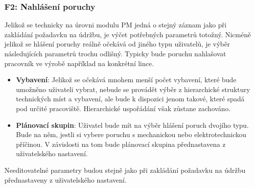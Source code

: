 \documentclass[thesis=M,czech]{FITthesis}[2012/06/26]
\begin{document}
\subsubsection{F2: Nahlášení poruchy}
Jelikož se technicky na úrovni modulu PM jedná o stejný záznam jako při zakládání požadavku na údržbu, je výčet potřebných parametrů totožný. Nicméně jelikož se hlášení poruchy reálně očekává od jiného typu uživatelů, je výběr následujících parametrů trochu odlišný. Typicky bude poruchu nahlašovat pracovník ve výrobě například na konkrétní lince. 
\begin{itemize}
	\item
	\textbf{Vybavení}: Jelikož se očekává mnohem menší počet vybavení, které bude umožněno uživateli vybrat, nebude se provádět výběr z hierarchické struktury technických míst a vybavení, ale bude k dispozici jenom takové, které spadá pod určité pracoviště. Hierarchické uspořádání však zůstane zachováno.
	\item
	\textbf{Plánovací skupin}: Uživatel bude mít na výběr hlášení poruch dvojího typu. Bude na něm, jestli si vybere poruchu s mechanickou nebo elektrotechnickou příčinou. V závislosti na tom bude plánovací skupina přednastavena z uživatelského nastavení.
\end{itemize} 
Needitovatelné parametry budou stejně jako při zakládání požadavku na údržbu přednastaveny z uživatelského nastavení.
\end{document}
